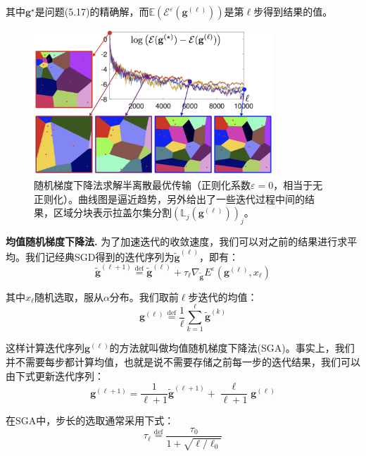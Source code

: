 \documentclass[cn,10pt,math=newtx,citestyle=gb7714-2015,bibstyle=gb7714-2015]{elegantbook}
\begin{document}
其中$\mathbf{g}^\star$是问题(5.17)的精确解，而$\mathbb{E}(\mathcal{E}^\varepsilon(\mathbf{g}^{(\ell)}))$是第$\ell$步得到结果的值。

\begin{figure}[H]
    \centering
    \includegraphics[width=0.8\textwidth]{figure/fig5.4.png}
    \caption{随机梯度下降法求解半离散最优传输（正则化系数$\varepsilon=0$，相当于无正则化）。曲线图是逼近趋势，另外给出了一些迭代过程中间的结果，区域分块表示拉盖尔集分割$(\mathbb{L}_j(\mathbf{g}^{(\ell)}))_j$。}
    \label{图5.4}
\end{figure}

\textbf{均值随机梯度下降法. } 为了加速迭代的收敛速度，我们可以对之前的结果进行求平均。我们记经典SGD得到的迭代序列为$\mathbf{\tilde g}^{(\ell)}$，即有：
\begin{equation}
    \mathbf{\tilde g}^{(\ell+1)} \overset{\text{def}}{=} \mathbf{\tilde g}^{(\ell)} + \tau_\ell \nabla_\mathbf{\tilde g} E^\varepsilon(\mathbf{g}^{(\ell)},x_\ell)
\end{equation}

其中$x_\ell$随机选取，服从$\alpha$分布。我们取前$\ell$步迭代的均值：
\begin{equation}
    \mathbf{g}^{(\ell)} \overset{\text{def}}{=} \frac{1}{\ell}\sum_{k=1}^\ell \mathbf{\tilde g}^{(k)}
\end{equation}

这样计算迭代序列$\mathbf{g}^{(\ell)}$的方法就叫做均值随机梯度下降法(SGA)。事实上，我们并不需要每步都计算均值，也就是说不需要存储之前每一步的迭代结果，我们可以由下式更新迭代序列：
\begin{equation}
    \mathbf{g}^{(\ell+1)} = \frac{1}{\ell+1} \mathbf{\tilde g}^{(\ell+1)} + \frac{\ell}{\ell+1} \mathbf{g}^{(\ell)}
\end{equation}

在SGA中，步长的选取通常采用下式：
\begin{equation}
    \tau_\ell \overset{\text{def}}{=} \frac{\tau_0}{1+\sqrt{\ell/\ell_0}}
\end{equation}
\end{document}
